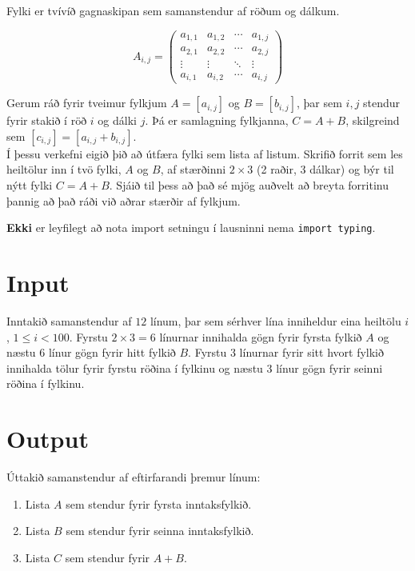 
Fylki er tvívíð gagnaskipan sem samanstendur af röðum og dálkum.

\begin{equation*}
    A_{i,j} = 
    \begin{pmatrix}
    a_{1,1} & a_{1,2} & \cdots & a_{1,j} \\
    a_{2,1} & a_{2,2} & \cdots & a_{2,j} \\
    \vdots  & \vdots  & \ddots & \vdots  \\
    a_{i,1} & a_{i,2} & \cdots & a_{i,j} 
    \end{pmatrix}
\end{equation*}

Gerum ráð fyrir tveimur fylkjum $A = [a_{i,j}]$ og $B = [b_{i,j}]$, þar sem $i,j$ stendur fyrir stakið í röð $i$ og dálki $j$.
Þá er samlagning fylkjanna, $C = A + B$, skilgreind sem $[c_{i,j}] = [a_{i,j} + b_{i,j}]$. \\

Í þessu verkefni eigið þið að útfæra fylki sem lista af listum.
Skrifið forrit sem les heiltölur inn í tvö fylki, $A$ og $B$, af stærðinni $2 \times 3$ (2 raðir, 3 dálkar) og býr til nýtt fylki $C = A + B$.
Sjáið til þess að það sé mjög auðvelt að breyta forritinu þannig að það ráði við aðrar stærðir af fylkjum.

\textbf{Ekki} er leyfilegt að nota import setningu í lausninni nema \texttt{import typing}. \\

\section*{Input}
Inntakið samanstendur af $12$ línum, þar sem sérhver lína inniheldur eina heiltölu $i$, $1 \le i < 100$.
Fyrstu $2 \times 3 = 6$ línurnar innihalda gögn fyrir fyrsta fylkið $A$ og næstu 6 línur gögn fyrir hitt fylkið $B$.
Fyrstu 3 línurnar fyrir sitt hvort fylkið innihalda tölur fyrir fyrstu röðina í fylkinu og næstu 3 línur gögn fyrir seinni röðina í fylkinu.

\section*{Output}
Úttakið samanstendur af eftirfarandi þremur línum:
\begin{enumerate}
    \item Lista $A$ sem stendur fyrir fyrsta inntaksfylkið.
    \item Lista $B$ sem stendur fyrir seinna inntaksfylkið.
    \item Lista $C$ sem stendur fyrir $A + B$.
    
\end{enumerate}
